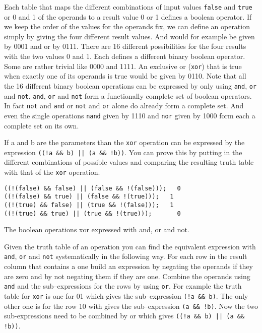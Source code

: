 Each table that maps the different combinations of input values {\tt false} and {\tt true} or 0 and 1 of the operands to a result value 0 or 1 defines a boolean operator. If we keep the order of the values for the operands fix, we can define an operation simply by giving the four different result values. And would for example be given by 0001 and or by 0111. There are 16 different possibilities for the four results with the two values 0 and 1. Each defines a different binary boolean operator. Some are rather trivial like 0000 and 1111. An exclusive or ({\tt xor}) that is true when exactly one of its operands is true would be given by 0110. Note that all the 16 different binary boolean operations can be expressed by only using {\tt and}, {\tt or} and {\tt not}. {\tt and}, {\tt or} and {\tt not} form a functionally complete set of boolean operators. In fact {\tt not} and {\tt and} or {\tt not} and {\tt or} alone do already form a complete set. And even the single operations {\tt nand} given by 1110 and {\tt nor} given by 1000 form each a complete set on its own.

If a and b are the parameters than the {\tt xor} operation can be expressed by the expression \texttt{((!a \&\& b) || (a \&\& !b))}. You can prove this by putting in the different combinations of possible values and comparing the resulting truth table with that of the {\tt xor} operation.

\begin{listing}[H]
\begin{verbatim}
((!(false) && false) || (false && !(false)));	0	
((!(false) && true) || (false && !(true)));	  1
((!(true) && false) || (true && !(false)));	  1
((!(true) && true) || (true && !(true)));	    0
\end{verbatim}
\caption{The boolean operations xor expressed with and, or and not.}
\label{lst:boolean_operation_xor}
\end{listing}

Given the truth table of an operation you can find the equivalent expression with {\tt and}, {\tt or} and {\tt not} systematically in the following way. For each row in the result column that contains a one build an expression by negating the operands if they are zero and by not negating them if they are one. Combine the operands using {\tt and} and the sub--expressions for the rows by using {\tt or}. For example the truth table for {\tt xor} is one for 01 which gives the sub--expression \texttt{(!a \&\& b)}. The only other one is for the row 10 with gives the sub--expression \texttt{(a \&\& !b)}. Now the two sub-expressions need to be combined by or which gives  \texttt{((!a \&\& b) || (a \&\& !b))}.

